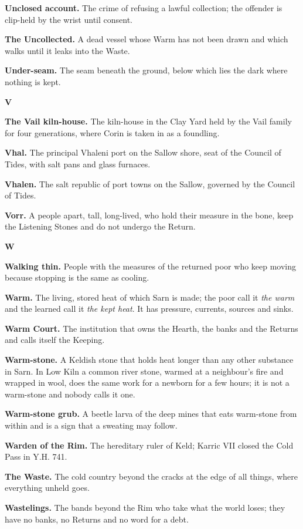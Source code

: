 \documentclass{design/chronicle}
\begin{document}
\textbf{Unclosed account.} The crime of refusing a lawful collection; the offender is clip-held by the wrist until consent.

\textbf{The Uncollected.} A dead vessel whose Warm has not been drawn and which walks until it leaks into the Waste.

\textbf{Under-seam.} The seam beneath the ground, below which lies the dark where nothing is kept.

\textbf{V}

\textbf{The Vail kiln-house.} The kiln-house in the Clay Yard held by the Vail family for four generations, where Corin is taken in as a foundling.

\textbf{Vhal.} The principal Vhaleni port on the Sallow shore, seat of the Council of Tides, with salt pans and glass furnaces.

\textbf{Vhalen.} The salt republic of port towns on the Sallow, governed by the Council of Tides.

\textbf{Vorr.} A people apart, tall, long-lived, who hold their measure in the bone, keep the Listening Stones and do not undergo the Return.

\textbf{W}

\textbf{Walking thin.} People with the measures of the returned poor who keep moving because stopping is the same as cooling.

\textbf{Warm.} The living, stored heat of which Sarn is made; the poor call it \emph{the warm} and the learned call it \emph{the kept heat}. It has pressure, currents, sources and sinks.

\textbf{Warm Court.} The institution that owns the Hearth, the banks and the Returns and calls itself the Keeping.

\textbf{Warm-stone.} A Keldish stone that holds heat longer than any other substance in Sarn. In Low Kiln a common river stone, warmed at a neighbour’s fire and wrapped in wool, does the same work for a newborn for a few hours; it is not a warm-stone and nobody calls it one.

\textbf{Warm-stone grub.} A beetle larva of the deep mines that eats warm-stone from within and is a sign that a sweating may follow.

\textbf{Warden of the Rim.} The hereditary ruler of Keld; Karric VII closed the Cold Pass in Y.H. 741.

\textbf{The Waste.} The cold country beyond the cracks at the edge of all things, where everything unheld goes.

\textbf{Wastelings.} The bands beyond the Rim who take what the world loses; they have no banks, no Returns and no word for a debt.
\end{document}
